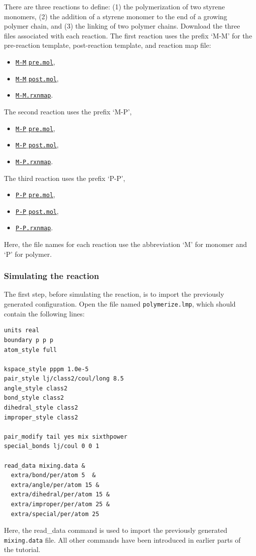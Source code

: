 \documentclass[9pt,tutorial]{livecoms}
\newcommand{\lmpcmd}[1]{\hspace{0pt}\colorbox{listing}{\textcolor{command}{\small{#1}}}\hspace{0pt}} %
\newcommand{\flecmd}[1]{\textcolor{command}{\texttt{#1}}} %
\newcommand{\dwlcmd}[1]{\textcolor{download}{\texttt{#1}}} %
\newcommand{\filepath}{https://raw.githubusercontent.com/lammpstutorials/lammpstutorials-article/main/files/}
\begin{document}
There are three reactions to define: (1) the polymerization of two styrene monomers,
(2) the addition of a styrene monomer to the end of a growing polymer chain, and (3) the
linking of two polymer chains.  Download the three files associated with each reaction.
The first reaction uses the prefix `M-M' for the pre-reaction template,
post-reaction template, and reaction map file:
\begin{itemize}
\item \href{\filepath tutorial8/M-M_pre.mol}{\dwlcmd{M-M$\_$pre.mol}},
\item \href{\filepath tutorial8/M-M_post.mol}{\dwlcmd{M-M$\_$post.mol}},
\item \href{\filepath tutorial8/M-M.rxnmap}{\dwlcmd{M-M.rxnmap}}.
\end{itemize}
The second reaction uses the prefix `M-P',
\begin{itemize}
\item \href{\filepath tutorial8/M-P_pre.mol}{\dwlcmd{M-P$\_$pre.mol}},
\item \href{\filepath tutorial8/M-P_post.mol}{\dwlcmd{M-P$\_$post.mol}},
\item \href{\filepath tutorial8/M-P.rxnmap}{\dwlcmd{M-P.rxnmap}}.
\end{itemize}
The third reaction uses the prefix `P-P',
\begin{itemize}
\item \href{\filepath tutorial8/P-P_pre.mol}{\dwlcmd{P-P$\_$pre.mol}},
\item \href{\filepath tutorial8/P-P_post.mol}{\dwlcmd{P-P$\_$post.mol}},
\item \href{\filepath tutorial8/P-P.rxnmap}{\dwlcmd{P-P.rxnmap}}.
\end{itemize}
Here, the file names for each reaction use the abbreviation `M' for monomer and `P'
for polymer.

\subsubsection{Simulating the reaction}

The first step, before simulating the reaction, is to import the previously
generated configuration.  Open the file named \flecmd{polymerize.lmp},
which should contain the following lines:
\begin{lstlisting}
units real
boundary p p p
atom_style full

kspace_style pppm 1.0e-5
pair_style lj/class2/coul/long 8.5
angle_style class2
bond_style class2
dihedral_style class2
improper_style class2

pair_modify tail yes mix sixthpower
special_bonds lj/coul 0 0 1

read_data mixing.data &
  extra/bond/per/atom 5  &
  extra/angle/per/atom 15 &
  extra/dihedral/per/atom 15 &
  extra/improper/per/atom 25 &
  extra/special/per/atom 25
\end{lstlisting}
Here, the \lmpcmd{read\_data} command is used to import the
previously generated \flecmd{mixing.data} file.  All other commands
have been introduced in earlier parts of the tutorial.
\end{document}
